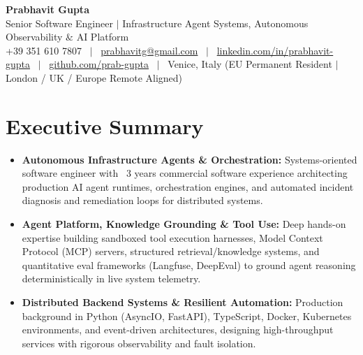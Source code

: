 \documentclass[a4paper,10pt]{article}
\begin{document}
\begin{minipage}[c]{0.80\textwidth}
  {\Huge\bfseries Prabhavit Gupta}\\[3pt]
  {\color{accent}\large Senior Software Engineer $\vert$ Infrastructure Agent Systems, Autonomous Observability $\&$ AI Platform}\\[6pt]
  {\footnotesize +39 351 610 7807 ~$\vert$~
  \href{mailto:prabhavitg@gmail.com}{prabhavitg@gmail.com} ~$\vert$~
  \href{https://www.linkedin.com/in/prabhavit-gupta}{linkedin.com/in/prabhavit-gupta} ~$\vert$~
  \href{https://github.com/prab-gupta}{github.com/prab-gupta} ~$\vert$~
  Venice, Italy (EU Permanent Resident $\vert$ London / UK / Europe Remote Aligned)}
\end{minipage}\hfill

\vspace{6pt}

\section{Executive Summary}
\begin{itemize}
  \item \textbf{Autonomous Infrastructure Agents \& Orchestration:} Systems-oriented software engineer with ~3 years commercial software experience architecting production AI agent runtimes, orchestration engines, and automated incident diagnosis and remediation loops for distributed systems.
  \item \textbf{Agent Platform, Knowledge Grounding \& Tool Use:} Deep hands-on expertise building sandboxed tool execution harnesses, Model Context Protocol (MCP) servers, structured retrieval/knowledge systems, and quantitative eval frameworks (Langfuse, DeepEval) to ground agent reasoning deterministically in live system telemetry.
  \item \textbf{Distributed Backend Systems \& Resilient Automation:} Production background in Python (AsyncIO, FastAPI), TypeScript, Docker, Kubernetes environments, and event-driven architectures, designing high-throughput services with rigorous observability and fault isolation.
\end{itemize}

\end{document}
